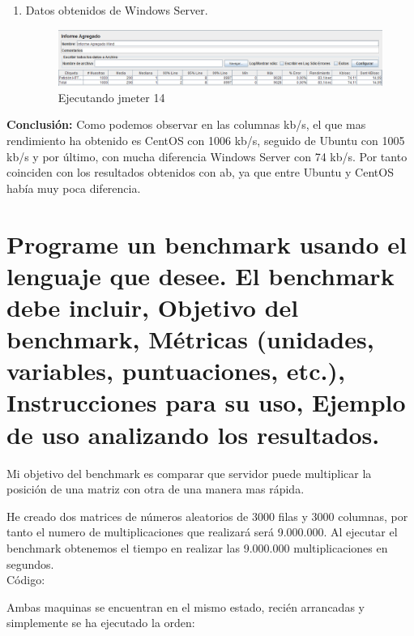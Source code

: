 \begin{enumerate}
	\item Datos obtenidos de Windows Server.

	\begin{figure}[H] %
		\centering
		\includegraphics[scale=0.3]{pics/14}  %
		\caption{Ejecutando jmeter 14} \label{fig:jmt14}
	\end{figure}
\end{enumerate}

\textbf{Conclusión: } Como podemos observar en las columnas kb/s, el que mas rendimiento ha obtenido es CentOS con 1006 kb/s, seguido de Ubuntu con 1005 kb/s y por último, con mucha diferencia Windows Server con 74 kb/s. Por tanto coinciden con los resultados obtenidos con ab, ya que entre Ubuntu y CentOS había muy poca diferencia.



\section[Cuestión 5]{ Programe un benchmark usando el lenguaje que desee. El benchmark debe incluir, Objetivo del benchmark, Métricas (unidades, variables, puntuaciones, etc.), Instrucciones para su uso, Ejemplo de uso analizando los resultados.}

Mi objetivo del benchmark es comparar que servidor puede multiplicar la posición de una matriz con otra de una manera mas rápida.

He creado dos matrices de números aleatorios de 3000 filas y 3000 columnas, por tanto el numero de multiplicaciones que realizará será 9.000.000.
Al ejecutar el benchmark obtenemos el tiempo en realizar las 9.000.000 multiplicaciones en segundos.\\

Código:



Ambas maquinas se encuentran en el mismo estado, recién arrancadas y simplemente se ha ejecutado la orden:\\

